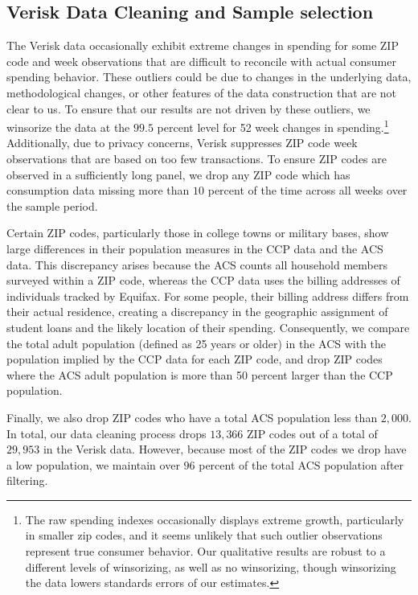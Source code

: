 \documentclass[12pt]{article}
\begin{document}
\subsection{Verisk Data Cleaning and Sample selection}
\label{sec:data_appendix_verisk}
The Verisk data occasionally exhibit extreme changes in spending for some ZIP code and week observations that are difficult to reconcile with actual consumer spending behavior. These outliers could be due to changes in the underlying data, methodological changes, or other features of the data construction that are not clear to us. To ensure that our results are not driven by these outliers, we winsorize the data at the $99.5$ percent level for 52 week changes in spending.\footnote{The raw spending indexes occasionally displays extreme growth, particularly in smaller zip codes, and it seems unlikely that such outlier observations represent true consumer behavior. Our qualitative results are robust to  a different levels of winsorizing, as well as no winsorizing, though winsorizing the data lowers standards errors of our estimates.} Additionally, due to privacy concerns, Verisk suppresses ZIP code week observations that are based on too few transactions. To ensure ZIP codes are observed in a sufficiently long panel, we drop any ZIP code which has consumption data missing more than $10$ percent of the time across all weeks over the sample period.  

Certain ZIP codes, particularly those in college towns or military bases, show large differences in their population measures in the CCP data and the ACS data. This discrepancy arises because the ACS counts all household members surveyed within a ZIP code, whereas the CCP data uses the billing addresses of individuals tracked by Equifax. For some people, their billing address differs from their actual residence, creating a discrepancy in the geographic assignment of student loans and the likely location of their spending. %
Consequently, we compare the total adult population (defined as 25 years or older) in the ACS with the population implied by the CCP data for each ZIP code, and drop ZIP codes where the ACS adult population is more than 50 percent larger than the CCP population.

Finally, we also drop ZIP codes who have a total ACS population less than $2,000$. In total, our data cleaning process drops $13,366$ ZIP codes out of a total of $29,953$ in the Verisk data. However, because most of the ZIP codes we drop have a low population, we maintain over $96$ percent of the total ACS population after filtering. 
\end{document}
